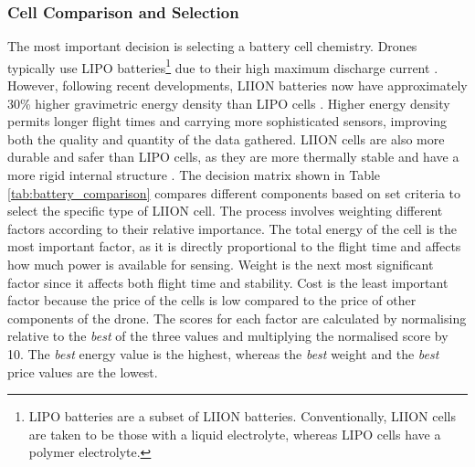 \subsubsection{Cell Comparison and Selection}

The most important decision is selecting a battery cell chemistry. Drones typically use \gls{LIPO} batteries\footnote{\acrshort{LIPO} batteries are a subset of \acrshort{LIION} batteries. Conventionally, \acrshort{LIION} cells are taken to be those with a liquid electrolyte, whereas \acrshort{LIPO} cells have a polymer electrolyte.} due to their high maximum discharge current \cite{10808488}. However, following recent developments, \gls{LIION} batteries now have approximately 30\% higher gravimetric energy density than \acrshort{LIPO} cells  \cite{Agrawal_2008}. Higher energy density permits longer flight times and carrying more sophisticated sensors, improving both the quality and quantity of the data gathered. \acrshort{LIION} cells are also more durable and safer than \acrshort{LIPO} cells, as they are more thermally stable and have a more rigid internal structure \cite{bergveld2014battery}. The decision matrix shown in Table \ref{tab:battery_comparison} compares different components based on set criteria to select the specific type of \acrshort{LIION} cell. The process involves weighting different factors according to their relative importance. The total energy of the cell is the most important factor, as it is directly proportional to the flight time and affects how much power is available for sensing. Weight is the next most significant factor since it affects both flight time and stability. Cost is the least important factor because the price of the cells is low compared to the price of other components of the drone. The scores for each factor are calculated by normalising relative to the \textit{best} of the three values and multiplying the normalised score by 10. The \textit{best} energy value is the highest, whereas the \textit{best} weight and the \textit{best} price values are the lowest. 

